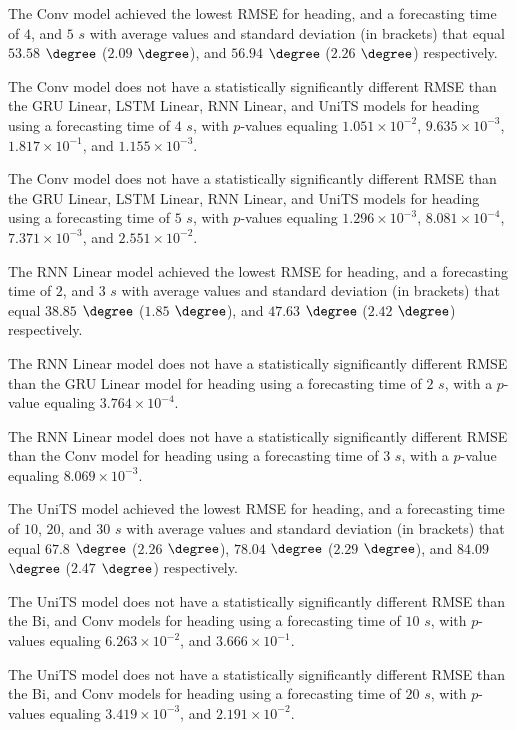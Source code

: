 The Conv model achieved the lowest RMSE for heading, and a forecasting time of $4$, and $5$ $s$ with average values and standard deviation (in brackets) that equal $53.58$ $\degree$ ($2.09$ $\degree$), and $56.94$ $\degree$ ($2.26$ $\degree$) respectively.

The Conv model does not have a statistically significantly different RMSE than the GRU Linear, LSTM Linear, RNN Linear, and UniTS models for heading using a forecasting time of $4$ $s$, with $p$-values equaling $1.051 \times 10^{-2}$, $9.635 \times 10^{-3}$, $1.817 \times 10^{-1}$, and $1.155 \times 10^{-3}$.

The Conv model does not have a statistically significantly different RMSE than the GRU Linear, LSTM Linear, RNN Linear, and UniTS models for heading using a forecasting time of $5$ $s$, with $p$-values equaling $1.296 \times 10^{-3}$, $8.081 \times 10^{-4}$, $7.371 \times 10^{-3}$, and $2.551 \times 10^{-2}$.

The RNN Linear model achieved the lowest RMSE for heading, and a forecasting time of $2$, and $3$ $s$ with average values and standard deviation (in brackets) that equal $38.85$ $\degree$ ($1.85$ $\degree$), and $47.63$ $\degree$ ($2.42$ $\degree$) respectively.

The RNN Linear model does not have a statistically significantly different RMSE than the GRU Linear model for heading using a forecasting time of $2$ $s$, with a $p$-value equaling $3.764 \times 10^{-4}$.

The RNN Linear model does not have a statistically significantly different RMSE than the Conv model for heading using a forecasting time of $3$ $s$, with a $p$-value equaling $8.069 \times 10^{-3}$.

The UniTS model achieved the lowest RMSE for heading, and a forecasting time of $10$, $20$, and $30$ $s$ with average values and standard deviation (in brackets) that equal $67.8$ $\degree$ ($2.26$ $\degree$), $78.04$ $\degree$ ($2.29$ $\degree$), and $84.09$ $\degree$ ($2.47$ $\degree$) respectively.

The UniTS model does not have a statistically significantly different RMSE than the Bi, and Conv models for heading using a forecasting time of $10$ $s$, with $p$-values equaling $6.263 \times 10^{-2}$, and $3.666 \times 10^{-1}$.

The UniTS model does not have a statistically significantly different RMSE than the Bi, and Conv models for heading using a forecasting time of $20$ $s$, with $p$-values equaling $3.419 \times 10^{-3}$, and $2.191 \times 10^{-2}$.

